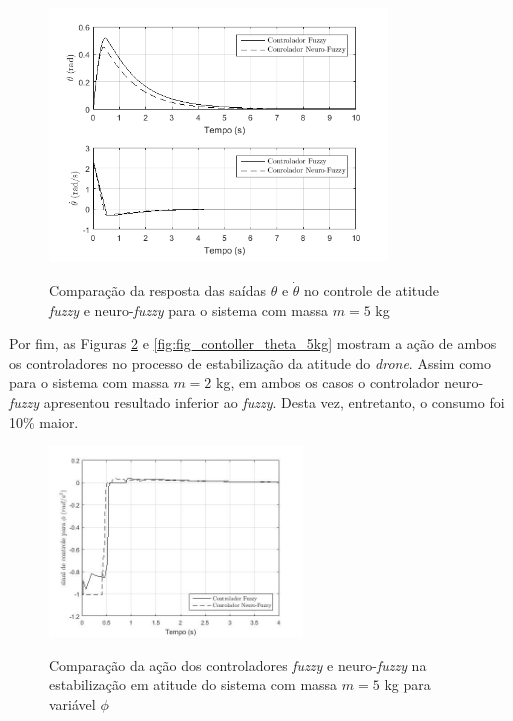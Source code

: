 \begin{figure}[!htb]
    \centering
    \caption{Comparação da resposta das saídas $\theta$ e $\dot{\theta}$ no controle de atitude \textit{fuzzy} e neuro-\textit{fuzzy} para o sistema com massa $m=5$ kg}
    \includegraphics[width=0.8\textwidth]{./04-figuras/resultados/novos/atitude_theta_thetadot_5kg_10s}
    \label{fig:atitude_theta_thetadot_5kg_10s}
\end{figure}

Por fim, as Figuras \ref{fig:fig_contoller_phi_5kg} e \ref{fig:fig_contoller_theta_5kg} mostram a ação de ambos os controladores no processo de estabilização da atitude do \textit{drone}. Assim como para o sistema com massa $m=2$ kg, em ambos os casos o controlador neuro-\textit{fuzzy} apresentou resultado inferior ao \textit{fuzzy}. Desta vez, entretanto, o consumo foi 10\% maior.

\begin{figure}[!htb]
    \centering
    \caption{Comparação da ação dos controladores \textit{fuzzy} e neuro-\textit{fuzzy} na estabilização em atitude do sistema com massa $m=5$ kg para variável $\phi$}
    \includegraphics[width=0.6\textwidth]{./04-figuras/figuras_pos_banca/4-atitude5kg/fig_contoller_phi_5kg}
    \label{fig:fig_contoller_phi_5kg}
\end{figure}

